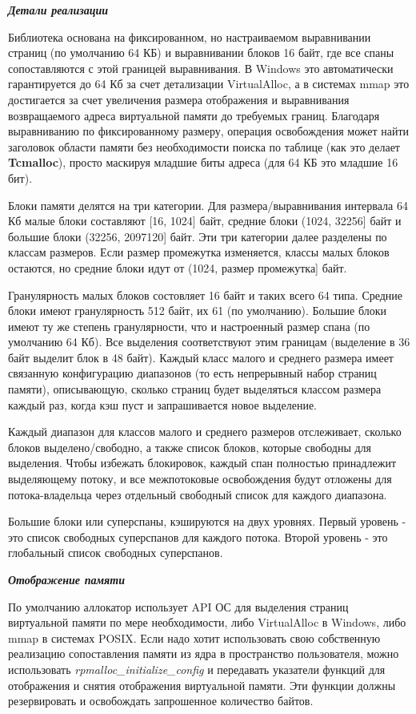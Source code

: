 \bigbreak
\textit{\textbf{Детали реализации}}
	
Библиотека основана на фиксированном, но настраиваемом выравнивании страниц (по умолчанию 64 КБ) и выравнивании блоков 16 байт, где все спаны сопоставляются с этой границей выравнивания. В Windows это автоматически гарантируется до 64 Кб за счет детализации VirtualAlloc, а в системах mmap это достигается за счет увеличения размера отображения и выравнивания возвращаемого адреса виртуальной памяти до требуемых границ. Благодаря выравниванию по фиксированному размеру, операция освобождения может найти заголовок области памяти без необходимости поиска по таблице (как это делает \textbf{Tcmalloc}), просто маскируя младшие биты адреса (для 64 КБ это младшие 16 бит).

Блоки памяти делятся на три категории. Для размера/выравнивания интервала 64 Кб малые блоки составляют [16, 1024] байт, средние блоки (1024, 32256] байт и большие блоки (32256, 2097120] байт. Эти три категории далее разделены по классам размеров. Если размер промежутка изменяется, классы малых блоков остаются, но средние блоки идут от (1024, размер промежутка] байт.

Гранулярность малых блоков состовляет 16 байт и таких всего 64 типа. Средние блоки имеют гранулярность 512 байт, их 61 (по умолчанию). Большие блоки имеют ту же степень гранулярности, что и настроенный размер спана (по умолчанию 64 Кб). Все выделения соответствуют этим границам (выделение в 36 байт выделит блок в 48 байт). Каждый класс малого и среднего размера имеет связанную конфигурацию диапазонов (то есть непрерывный набор страниц памяти), описывающую, сколько страниц будет выделяться классом размера каждый раз, когда кэш пуст и запрашивается новое выделение.

Каждый диапазон для классов малого и среднего размеров отслеживает, сколько блоков выделено/свободно, а также список блоков, которые свободны для выделения. Чтобы избежать блокировок, каждый спан полностью принадлежит выделяющему потоку, и все межпотоковые освобождения будут отложены для потока-владельца через отдельный свободный список для каждого диапазона.

Большие блоки или суперспаны, кэшируются на двух уровнях. Первый уровень - это список свободных суперспанов для каждого потока. Второй уровень - это глобальный список свободных суперспанов.

\bigbreak
\textit{\textbf{Отображение памяти}}

По умолчанию аллокатор использует API ОС для выделения страниц виртуальной памяти по мере необходимости, либо VirtualAlloc в Windows, либо mmap в системах POSIX. Если надо хотит использовать свою собственную реализацию сопоставления памяти из ядра в пространство пользователя, можно использовать \textit{rpmalloc\_initialize\_config }и передавать указатели функций для отображения и снятия отображения виртуальной памяти. Эти функции должны резервировать и освобождать запрошенное количество байтов.


